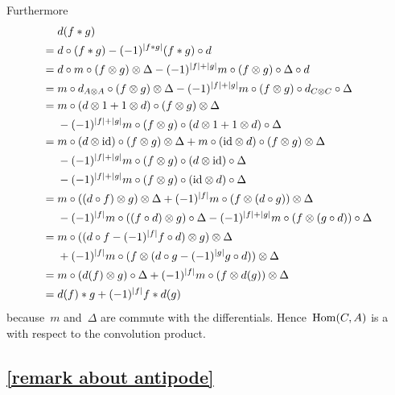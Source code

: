 Furthermore
\begingroup
\allowdisplaybreaks
\begin{align*}
  {}&
  d(f * g)
  \\
  ={}&
  d \circ (f * g)
  -
  (-1)^{\lvert f * g\rvert} (f * g) \circ d
  \\
  ={}&
  d \circ m \circ (f \otimes g) \otimes \Delta
  -
  (-1)^{\lvert f\rvert + \lvert g\rvert}
  m \circ (f \otimes g) \circ \Delta \circ d
  \\
  ={}&
  m \circ d_{A \otimes A} \circ (f \otimes g) \otimes \Delta
  -
  (-1)^{\lvert f\rvert + \lvert g\rvert}
  m \circ (f \otimes g) \circ d_{C \otimes C} \circ \Delta
  \\
  ={}&
  m \circ (d \otimes 1 + 1 \otimes d) \circ (f \otimes g) \otimes \Delta
  \\
  {}&
  -
  (-1)^{\lvert f\rvert + \lvert g\rvert}
  m \circ (f \otimes g) \circ (d \otimes 1 + 1 \otimes d) \circ \Delta
  \\
  ={}&
    m \circ (d \otimes {\operatorname{id}}) \circ (f \otimes g) \otimes \Delta
  + m \circ ({\operatorname{id}} \otimes d) \circ (f \otimes g) \otimes \Delta
  \\
  {}&
  - (-1)^{\lvert f\rvert + \lvert g\rvert} m \circ (f \otimes g) \circ (d \otimes {\operatorname{id}}) \circ \Delta
  \\
  {}&
  - (-1)^{\lvert f\rvert + \lvert g\rvert} m \circ (f \otimes g) \circ ({\operatorname{id}} \otimes d) \circ \Delta
  \\
  ={}&
    m \circ ((d \circ f) \otimes g) \otimes \Delta
  + (-1)^{\lvert f\rvert} m \circ (f \otimes (d \circ g)) \otimes \Delta
  \\
  {}&
  - (-1)^{\lvert f\rvert} m \circ ((f \circ d) \otimes g) \circ \Delta
  - (-1)^{\lvert f\rvert + \lvert g\rvert} m \circ (f \otimes (g \circ d))\circ \Delta
  \\
  ={}&
    m \circ ((d \circ f - (-1)^{\lvert f\rvert} f \circ d) \otimes g) \otimes \Delta
  \\
  {}&
  + (-1)^{\lvert f\rvert} m \circ (f \otimes (d \circ g - (-1)^{\lvert g\rvert} g \circ d)) \otimes \Delta
  \\
  ={}&
    m \circ (d(f) \otimes g) \circ \Delta
  + (-1)^{\lvert f\rvert} m \circ (f \otimes d(g)) \otimes \Delta
  \\
  ={}&
  d(f) * g + (-1)^{\lvert f\rvert} f * d(g)
\end{align*}
\endgroup
because~$m$ and~$\Delta$ are commute with the differentials.
Hence~$\operatorname{Hom}(C,A)$ is a {\dga} with respect to the convolution product.



\subsection{\cref{remark about antipode}}
\label{remark about antipode proof}

